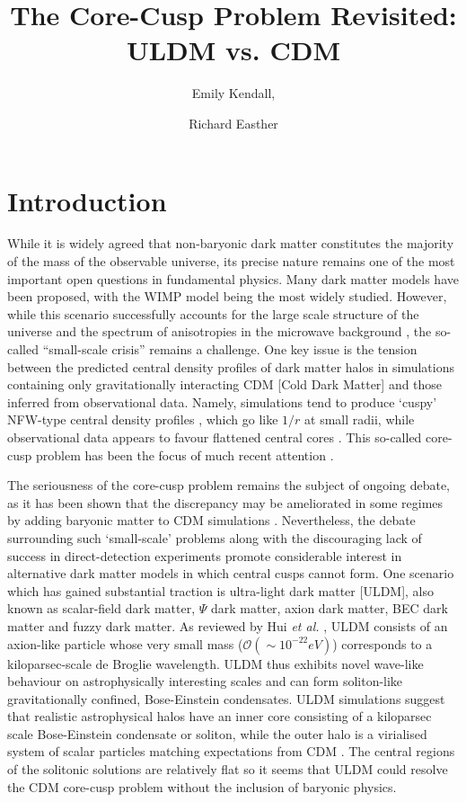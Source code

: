 \documentclass[a4paper,11pt]{article}
\title{\boldmath The Core-Cusp Problem Revisited: ULDM vs. CDM}
\author[1]{Emily Kendall,}
\author[1]{Richard Easther}
\affiliation[1]{Department of Physics, University of Auckland, Private Bag 92019, Auckland, New Zealand}
\begin{document}
\maketitle
\flushbottom


\section{Introduction}\label{sec:intro}

While it is widely agreed that non-baryonic dark matter constitutes the majority of the mass of the observable universe, its precise nature remains one of the most important open questions in fundamental physics. Many dark matter models have been proposed, with the WIMP model being the most widely studied. However, while this scenario successfully accounts for the large scale structure of the universe \cite{Springel:2005nw} and the spectrum of anisotropies in the microwave background \cite{deBernardis:2000sbo, Hanany:2000qf, Halverson:2001yy, Netterfield:2001yq, Lee:2001yp, Ade:2015xua,  Hu:2001bc}, the so-called ``small-scale crisis'' \cite{Weinberg:2013aya} remains a challenge. One key issue is the tension between the predicted central density profiles of dark matter halos in simulations containing only gravitationally interacting CDM [Cold Dark Matter] and those inferred from observational data. Namely, simulations tend to produce `cuspy' NFW-type central density profiles \cite{Navarro:1995iw}, which go like $1/r$ at small radii, while observational data appears to favour flattened central cores \cite{Moore:1994yx} . This so-called core-cusp problem has been the focus of much recent attention \cite{Dutton:2018nop, Read:2018pft, Genina:2018}. 

The seriousness of the core-cusp problem remains the subject of ongoing debate, as it has been shown that the discrepancy may be ameliorated in some regimes by adding baryonic matter to CDM simulations  \cite{Benitez-Llambay:2018}. Nevertheless, the debate surrounding such `small-scale' problems along with the discouraging lack of success in direct-detection experiments \cite{Schumann:2019eaa} promote considerable interest in alternative dark matter models in which central cusps cannot form. One scenario which has gained substantial traction is ultra-light dark matter [ULDM], also known as scalar-field dark matter, $\Psi$ dark matter, axion dark matter, BEC dark matter and fuzzy dark matter. As reviewed by Hui {\em et al.\/} \cite{Hui:2016ltb}, ULDM consists of an axion-like particle whose very small mass  ($\mathcal{O}(\sim 10^{-22}eV)$) corresponds to a kiloparsec-scale de Broglie wavelength. ULDM thus exhibits novel wave-like behaviour on astrophysically interesting scales and can form soliton-like gravitationally confined, Bose-Einstein condensates. ULDM simulations suggest that realistic astrophysical halos have an inner core consisting of a kiloparsec scale Bose-Einstein condensate or soliton, while the outer halo is a virialised system of scalar particles  matching expectations from CDM \cite{Schwabe:2016rze, Veltmaat:2018dfz}. The central regions of the solitonic solutions are relatively flat so it seems that ULDM could  resolve the CDM core-cusp problem without the inclusion of baryonic physics. 
\end{document}

